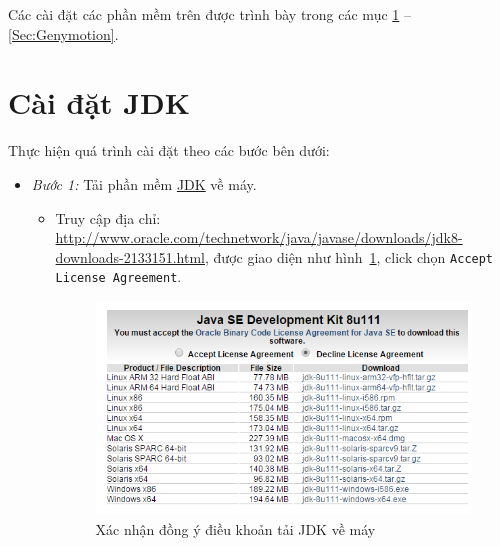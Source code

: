 \documentclass[13pt,a4paper]{extreport}
\begin{document}
	Các cài đặt các phần mềm trên được trình bày trong các mục \ref{Sec:JDK} -- \ref{Sec:Genymotion}.

\section{Cài đặt JDK}\label{Sec:JDK}
	Thực hiện quá trình cài đặt theo các bước bên dưới:
	\begin{itemize}
		\item \textit{Bước 1:} Tải phần mềm \href{http://www.oracle.com/technetwork/java/javase/downloads/jdk8-downloads-2133151.html}{JDK} về máy.
			\begin{itemize}
				\item Truy cập địa chỉ: \url{http://www.oracle.com/technetwork/java/javase/downloads/jdk8-downloads-2133151.html}, được giao diện như hình~\ref{Fig:setup-JDK-1}, click chọn \verb|Accept License Agreement|.				
					\begin{figure}[!h]
						\vspace{-.5cm}
						\begin{center}
								\includegraphics[scale=1]{setup-JDK-1.png}
						\end{center}
						\vspace{-.5cm}
						\caption{Xác nhận đồng ý điều khoản tải JDK về máy}
						\label{Fig:setup-JDK-1}
						\vspace{-.5cm}
					\end{figure}
				

\end{itemize}
\end{itemize}
\end{document}
